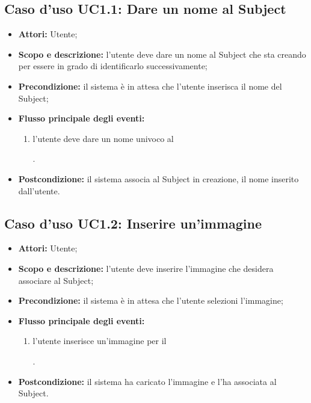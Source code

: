 \subsection{Caso d'uso UC1.1: Dare un nome al Subject}
\begin{itemize}
\item \textbf{Attori:} Utente;
\item \textbf{Scopo e descrizione:} l'utente deve dare un nome al Subject\glossario{} che sta creando per essere in grado di identificarlo successivamente;
\item \textbf{Precondizione:} il sistema è in attesa che l'utente inserisca il nome del Subject\glossario{};
\item \textbf{Flusso principale degli eventi:}
\begin{enumerate}
\item l'utente deve dare un nome univoco al \subject{}.
\end{enumerate}
\item \textbf{Postcondizione:} il sistema associa al Subject\glossario{} in creazione, il nome inserito dall'utente.
\end{itemize}

\subsection{Caso d'uso UC1.2: Inserire un'immagine}
\begin{itemize}
\item \textbf{Attori:} Utente;
\item \textbf{Scopo e descrizione:} l'utente deve inserire l'immagine che desidera associare al Subject\glossario{};
\item \textbf{Precondizione:} il sistema è in attesa che l'utente selezioni l'immagine;
\item \textbf{Flusso principale degli eventi:}
\begin{enumerate}
\item l'utente inserisce un'immagine per il \subject{}.
\end{enumerate}
\item \textbf{Postcondizione:} il sistema ha caricato l'immagine e l'ha associata al Subject\glossario{}.
\end{itemize}

